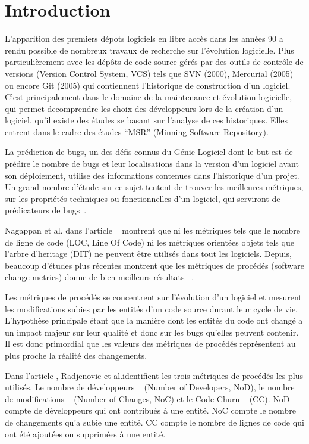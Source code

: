 \section{Introduction}
\label{sec:intro}

L'apparition des premiers dépots logiciels en libre accès dans les années 90 a rendu possible de nombreux travaux de recherche sur l'évolution logicielle. Plus particulièrement avec les dépôts de code source gérés par des outils de contrôle de versions (Version Control System, VCS) tels que  SVN (2000), Mercurial (2005) ou encore Git (2005) qui contiennent l'historique de construction d'un logiciel.\\  

C'est principalement dans le domaine de la maintenance et évolution logicielle, qui permet decomprendre les choix des développeurs lors de la création d'un logiciel, qu'il existe des études se basant sur l'analyse de ces historiques. Elles entrent dans le cadre des études ``MSR'' (Minning Software Repository).

La prédiction de bugs, un des défis connus du Génie Logiciel dont le but est de prédire le nombre de bugs et leur localisations dans la version d'un logiciel avant son déploiement, utilise des informations contenues dans l'historique d'un projet. Un grand nombre d'étude sur ce sujet tentent de trouver les meilleures métriques, sur les propriétés techniques ou fonctionnelles d'un logiciel, qui serviront de prédicateurs de bugs~\cite{fenton_critique_1999}.

Nagappan et al. dans l'article ~\cite{nagappan_mining_2006} montrent que ni les métriques tels que le nombre de ligne de code (LOC, Line Of Code) ni les métriques orientées objets tels que l'arbre d'heritage (DIT) ne peuvent être utilisés dans tout les logiciels. Depuis, beaucoup d'études plus récentes montrent que les métriques de procédés (software change metrics) donne de bien meilleurs résultats ~\cite{nagappan_use_2005,weyuker_too_2008,bird_dont_2011,giger_can_2012}.

Les métriques de procédés se concentrent sur l'évolution d'un logiciel et mesurent les modifications subies par les entités d'un code source durant leur cycle de vie. L'hypothèse principale étant que la manière dont les entités du code ont changé a un impact majeur sur leur qualité et donc sur les bugs qu'elles peuvent contenir. Il est donc primordial que les valeurs des métriques de procédés représentent au plus proche la réalité des changements.

Dans l'article \cite{radjenovic_software_2013}, Radjenovic et al.identifient les trois métriques de procédés les plus utilisés. Le nombre de développeurs ~\cite{weyuker_too_2008} (Number of Developers, NoD), le nombre de modifications ~\cite{graves_predicting_2000} (Number of Changes, NoC) et le Code Churn ~\cite{munson_code_1998} (CC). NoD compte de développeurs qui ont contribués à une entité. NoC compte le nombre de changements qu'a subie une entité. CC compte le nombre de lignes de code qui ont été ajoutées ou supprimées à une entité.\\
 


